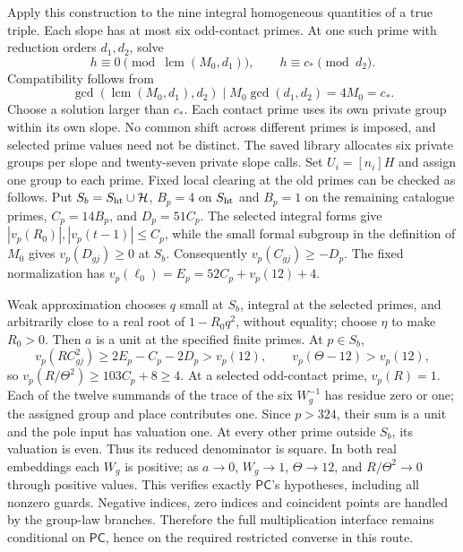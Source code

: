 Apply this construction to the nine integral homogeneous quantities
of a true triple. Each slope has at most six odd-contact primes.
At one such prime with reduction orders $d_1,d_2$, solve
\[
 h\equiv0\pmod{\operatorname{lcm}(M_0,d_1)},\qquad
 h\equiv c_*\pmod{d_2}.
\]
Compatibility follows from
\[
 \gcd(\operatorname{lcm}(M_0,d_1),d_2)
                  \mid M_0\gcd(d_1,d_2)=4M_0=c_*.
\]
Choose a solution larger than $c_*$. Each contact prime uses its own
private group within its own slope. No common shift across different
primes is imposed, and selected prime values need not be distinct.
The saved library allocates six private groups per slope and twenty-seven
private slope calls. Set $U_i=[n_i]H$ and assign one group to each prime. Fixed local
clearing at the old primes can be checked as follows.
Put $S_b=S_{\rm ht}\cup\mathcal H$, $B_p=4$ on $S_{\rm ht}$ and
$B_p=1$ on the remaining catalogue primes, $C_p=14B_p$, and
$D_p=51C_p$. The selected integral forms give
$|v_p(R_0)|,|v_p(t-1)|\le C_p$, while the small formal subgroup
in the definition of $M_0$ gives $v_p(D_{gj})\ge0$ at $S_b$.
Consequently $v_p(C_{gj})\ge-D_p$. The fixed normalization has
$v_p(\ell_0)=E_p=52C_p+v_p(12)+4$.

Weak approximation chooses $q$ small at $S_b$, integral at the
selected primes, and arbitrarily close to a real root of
$1-R_0q^2$, without equality; choose $\eta$ to make $R_0>0$.
Then $a$ is a unit at the specified finite primes. At $p\in S_b$,
\[
 v_p(RC_{gj}^2)\ge 2E_p-C_p-2D_p>v_p(12),\qquad
 v_p(\Theta-12)>v_p(12),
\]
so $v_p(R/\Theta^2)\ge103C_p+8\ge4$.
At a selected odd-contact prime, $v_p(R)=1$. Each of the twelve
summands of the trace of the six $W_g^{-1}$ has residue zero or one;
the assigned group and place contributes one. Since $p>324$, their
sum is a unit and the pole input has valuation one. At every other
prime outside $S_b$, its valuation is even. Thus its reduced
denominator is square. In both real embeddings each $W_g$ is positive;
as $a\to0$, $W_g\to1$, $\Theta\to12$, and $R/\Theta^2\to0$
through positive values. This verifies exactly $\mathsf{PC}$'s
hypotheses, including all nonzero guards. Negative indices, zero indices and
coincident points are handled by the group-law branches. Therefore
the full multiplication interface remains conditional on
$\mathsf{PC}$, hence on the required restricted converse in this route.
